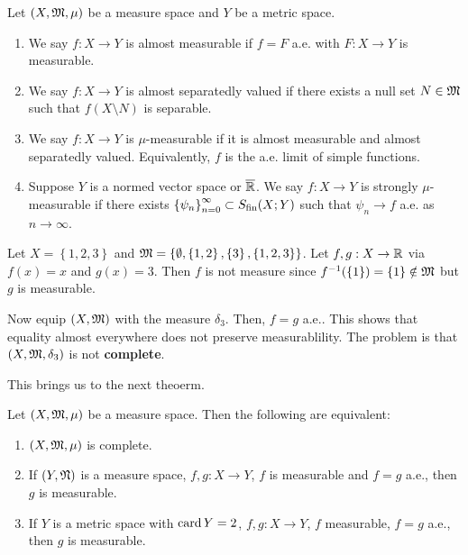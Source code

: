 \documentclass[a4paper]{article}
\begin{document}
\begin{defi}
  Let $(X, \mathfrak{M}, \mu)$ be a measure space and $Y$ be a metric 
  space. 
  \begin{enumerate}
    \item We say $f : X \to Y$ is almost measurable 
    if $f = F$ a.e. with $F: X \to Y$ is measurable.
    
    \item We say $f : X \to Y$ is almost separatedly valued
    if there exists a null set $N \in \mathfrak{M}$ such that 
    $f(X \setminus N)$ is separable.
    
    \item We say $f: X \to Y$ is $\mu$-measurable if 
    it is almost measurable and almost separatedly valued.
    Equivalently, $f$ is the a.e. limit of simple functions.

    \item Suppose $Y$ is a normed vector space or $\overline{\mathbb{R}}$.
    We say $f: X \to Y$ is strongly $\mu$-measurable 
    if there exists $\left\{ \psi_n \right\}_{n=0}^\infty \subset S_{\text{fin}}(X; Y)$
    such that $\psi_n \to f$ a.e. as $n \to \infty$.
  \end{enumerate}
\end{defi}

\begin{eg}
  Let $X = \left\{ 1,2,3 \right\}$ and $\mathfrak{M} = 
  \left\{ \emptyset, \left\{ 1, 2 \right\}, 
  \left\{ 3 \right\}, \left\{ 1, 2, 3 \right\} \right\}$.
  Let $f, g: X \to \mathbb{R}$ via $f(x) = x$ and $g(x) = 3$.
  Then $f$ is not measure since $f^{-1} (\left\{ 1 \right\})
  = \left\{ 1 \right\} \notin \mathfrak{M}$ but $g$ is measurable.

  Now equip $(X, \mathfrak{M})$ with the measure $\delta_3$.
  Then, $f = g$ a.e.. This shows that equality almost 
  everywhere does not preserve measurablility.
  The problem is that $(X, \mathfrak{M}, \delta_3)$ is not 
  \textbf{complete}.
\end{eg}

This brings us to the next theoerm.

\begin{thm}
Let $(X, \mathfrak{M}, \mu)$ be a measure space. Then the following 
are equivalent:
\begin{enumerate}
  \item $(X, \mathfrak{M}, \mu)$ is complete. 
  \item If $(Y, \mathfrak{N})$ is a measure space, $f, g : X 
  \to Y$, $f$ is measurable and $f = g$ a.e., then 
  $g$ is measurable.
  \item If $Y$ is a metric space with $\operatorname{card} Y = 2$, 
  $f, g: X \to Y$, $f$ measurable, $f = g$ a.e., 
  then $g$ is measurable.
\end{enumerate}  
\end{thm}
\end{document}
